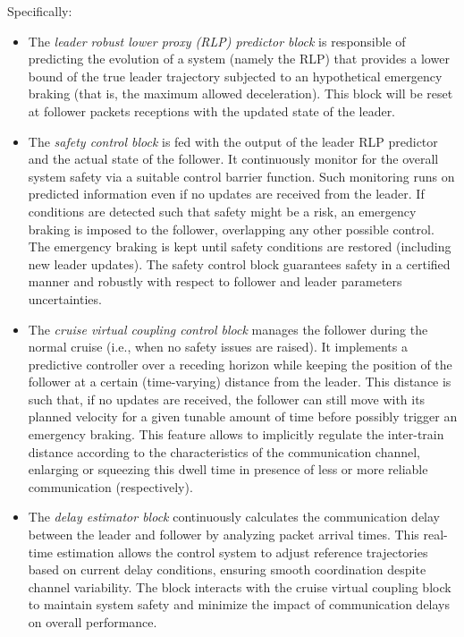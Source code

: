 \documentclass[letterpaper, 10 pt, conference]{ieeeconf}
\theoremstyle{definition}
\theoremstyle{nopoint}
\begin{document}
Specifically:
\begin{itemize}
\item The {\em leader robust lower proxy (RLP) predictor block} is responsible of predicting the evolution of a system (namely the RLP) that provides a lower bound of the true leader trajectory subjected to an hypothetical emergency braking (that is, the maximum allowed deceleration). 
This block will be reset at follower packets receptions with the updated state of the leader. 
\item The {\em safety control block} is fed with the output of the leader RLP predictor and the actual state of the follower. It continuously monitor for the overall system safety via a suitable control barrier function. Such monitoring runs on predicted information even if no updates are received from the leader. If conditions are detected such that safety might be a risk, an emergency braking is imposed to the follower, overlapping any other possible control. The emergency braking is kept until safety conditions are restored (including new leader updates). The safety control block guarantees safety in a certified manner and robustly with respect to follower and leader parameters uncertainties.
\item The {\em cruise virtual coupling control block} manages the follower during the normal cruise (i.e., when no safety issues are raised). It implements a predictive controller over a receding horizon while keeping the position of the follower at a certain (time-varying) distance from the leader. This distance is such that, if no updates are received, the follower can still move with its planned velocity for a given tunable amount of time before possibly trigger an emergency braking. 
This feature allows to implicitly regulate the inter-train distance according to the characteristics of the communication channel, enlarging or squeezing this dwell time in presence of less or more reliable communication (respectively). 

\item The {\em  delay estimator block} continuously calculates the communication delay between the leader and follower by analyzing packet arrival times. This real-time estimation allows the control system to adjust reference trajectories based on current delay conditions, ensuring smooth coordination despite channel variability. The block interacts with the cruise virtual coupling block to maintain system safety and minimize the impact of communication delays on overall performance.
\end{itemize} 
\end{document}
